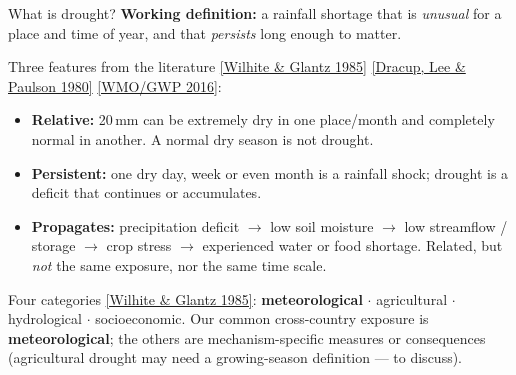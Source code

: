 \documentclass[10pt, aspectratio=169]{beamer}
\newcommand{\paperlink}[2]{\href{#1}{\textcolor{blue!50!black}{\footnotesize [#2]}}}
\begin{document}
\begin{frame}{What is drought?}
  \textbf{Working definition:} a rainfall shortage that is \emph{unusual} for a
  place and time of year, and that \emph{persists} long enough to matter.
  \vspace{0.6em}

  Three features from the literature
  \paperlink{https://doi.org/10.1080/02508068508686328}{Wilhite \& Glantz 1985}
  \paperlink{https://doi.org/10.1029/WR016i002p00297}{Dracup, Lee \& Paulson 1980}
  \paperlink{https://www.droughtmanagement.info/find/guidelines-tools/handbook-drought-indicators-and-indices/}{WMO/GWP 2016}:
  \begin{itemize}
    \item \textbf{Relative:} 20\,mm can be extremely dry in one place/month and
          completely normal in another. A normal dry season is not drought.
    \item \textbf{Persistent:} one dry day, week or even month is a rainfall
          shock; drought is a deficit that continues or accumulates.
    \item \textbf{Propagates:} precipitation deficit $\rightarrow$ low soil
          moisture $\rightarrow$ low streamflow / storage $\rightarrow$ crop
          stress $\rightarrow$ experienced water or food shortage. Related, but
          \emph{not} the same exposure, nor the same time scale.
  \end{itemize}
  \vspace{0.4em}
  Four categories \paperlink{https://doi.org/10.1080/02508068508686328}{Wilhite \& Glantz 1985}:
  \textbf{meteorological} $\cdot$ agricultural $\cdot$ hydrological $\cdot$
  socioeconomic. Our common cross-country exposure is \textbf{meteorological};
  the others are mechanism-specific measures or consequences (agricultural
  drought may need a growing-season definition --- to discuss).
\end{frame}
\end{document}
